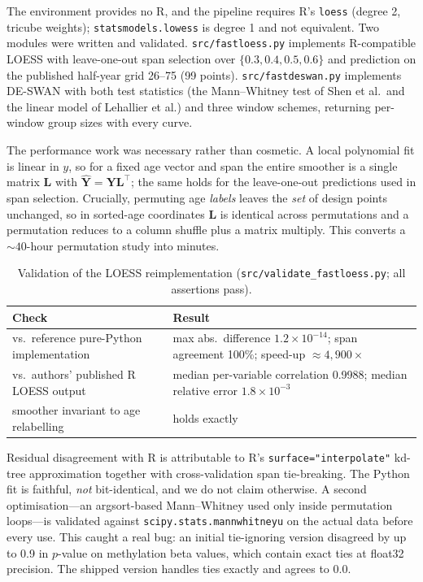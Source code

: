 \documentclass{article}
\begin{document}
The environment provides no R, and the pipeline requires R's \texttt{loess} (degree 2, tricube weights); \texttt{statsmodels.lowess} is degree 1 and not equivalent. Two modules were written and validated. \texttt{src/fastloess.py} implements R-compatible LOESS with leave-one-out span selection over $\{0.3,0.4,0.5,0.6\}$ and prediction on the published half-year grid 26--75 (99 points). \texttt{src/fastdeswan.py} implements DE-SWAN with both test statistics (the Mann--Whitney test of Shen et al.\ and the linear model of Lehallier et al.) and three window schemes, returning per-window group sizes with every curve.

The performance work was necessary rather than cosmetic. A local polynomial fit is linear in $y$, so for a fixed age vector and span the entire smoother is a single matrix $\mathbf{L}$ with $\hat{\mathbf{Y}} = \mathbf{Y}\mathbf{L}^{\top}$; the same holds for the leave-one-out predictions used in span selection. Crucially, permuting age \emph{labels} leaves the \emph{set} of design points unchanged, so in sorted-age coordinates $\mathbf{L}$ is identical across permutations and a permutation reduces to a column shuffle plus a matrix multiply. This converts a ${\sim}40$-hour permutation study into minutes.

\begin{table}[h]
\centering
\caption{Validation of the LOESS reimplementation (\texttt{src/validate\_fastloess.py}; all assertions pass).}
\begin{tabular}{ll}
\toprule
Check & Result \\
\midrule
vs.\ reference pure-Python implementation & max abs.\ difference $1.2\times10^{-14}$; span agreement 100\%; speed-up ${\approx}4{,}900\times$ \\
vs.\ authors' published R LOESS output & median per-variable correlation 0.9988; median relative error $1.8\times10^{-3}$ \\
smoother invariant to age relabelling & holds exactly \\
\bottomrule
\end{tabular}
\end{table}

Residual disagreement with R is attributable to R's \texttt{surface="interpolate"} kd-tree approximation together with cross-validation span tie-breaking. The Python fit is faithful, \emph{not} bit-identical, and we do not claim otherwise. A second optimisation---an argsort-based Mann--Whitney used only inside permutation loops---is validated against \texttt{scipy.stats.mannwhitneyu} on the actual data before every use. This caught a real bug: an initial tie-ignoring version disagreed by up to 0.9 in $p$-value on methylation beta values, which contain exact ties at float32 precision. The shipped version handles ties exactly and agrees to 0.0.
\end{document}
